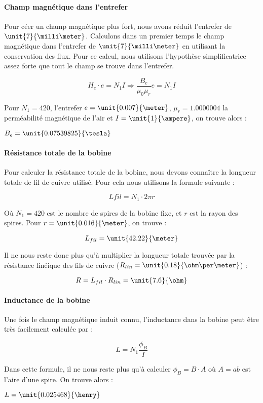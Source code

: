 \paragraph{Champ magnétique dans l'entrefer}
Pour céer un champ magnétique plus fort, nous avons réduit l'entrefer de $\unit{7}{\milli\meter}$.
Calculons dans un premier temps le champ magnétique dans l'entrefer de $\unit{7}{\milli\meter}$ en 
utilisant la conservation des flux. Pour ce calcul, nous utilisons l'hypothèse simplificatrice
assez forte que tout le champ se trouve dans l'entrefer.

$$H_e \cdot e = N_1 I \Rightarrow \frac{B_e}{\mu_0 \mu_r} e = N_1 I$$

Pour $N_1 = 420$, l'entrefer $e = \unit{0.007}{\meter}$, $\mu_r = 1.0000004$ la perméabilité magnétique
de l'air et $I = \unit{1}{\ampere}$, on trouve alors :

$B_e = \unit{0.07539825}{\tesla}$

\paragraph{Résistance totale de la bobine}
Pour calculer la résistance totale de la bobine, nous devons connaître la longueur totale de fil de cuivre utilisé.
Pour cela nous utilisons la formule suivante :

$$L{fil} = N_1 \cdot 2\pi r$$  

Où $N_1 = 420$ est le nombre de spires de la bobine fixe, et $r$ est la rayon des spires. Pour
$r = \unit{0.016}{\meter}$, on trouve :

$$L_{fil} = \unit{42.22}{\meter}$$

Il ne nous reste donc plus qu'à multiplier la longueur totale trouvée par la résistance linéique des fils de cuivre
($R_{lin} = \unit{0.18}{\ohm\per\meter}$) :

$$R = L_{fil} \cdot R_{lin} = \unit{7.6}{\ohm}$$

\paragraph{Inductance de la bobine}
Une fois le champ magnétique induit connu, l'inductance dans la bobine peut être très facilement calculée par :

$$L = N_1 \frac{\phi_B}{I}$$

Dans cette formule, il ne nous reste plus qu'à calculer $\phi_B = B \cdot A$ où $A = ab$ est l'aire d'une spire.
On trouve alors :

$L = \unit{0.025468}{\henry}$

